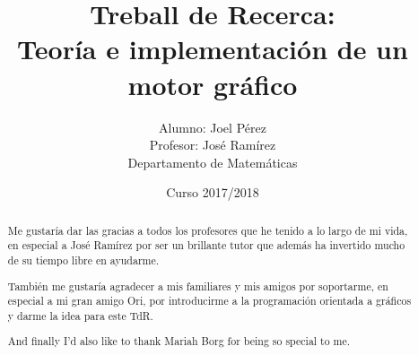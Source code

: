 \message{ !name(treballr.tex)}\documentclass[12pt, a4paper]{report}
\title{Treball de Recerca:\\Teoría e implementación de un motor gráfico}
\date{Curso 2017/2018}
\author{Alumno: Joel Pérez\\Profesor: José Ramírez\\Departamento de Matemáticas}
\begin{document}
\begin{abstract}
  Me gustaría dar las gracias a todos los profesores que he tenido a lo largo de mi vida, en especial a José Ramírez por ser un brillante tutor que además ha invertido mucho de su tiempo libre en ayudarme.

  También me gustaría agradecer a mis familiares y mis amigos por soportarme, en especial a mi gran amigo Ori, por introducirme a la programación orientada a gráficos y darme la idea para este TdR.

  And finally I'd also like to thank Mariah Borg for being so special to me.
\end{abstract}

\end{document}
